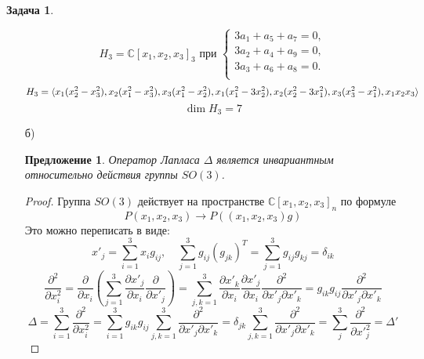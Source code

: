 \documentclass[12pt]{article}
\newtheorem{predl}[theorem]{Предложение}
\theoremstyle{definition}
\newtheorem{zad}{Задача}[section]
\begin{document}
\begin{zad}
\begin{itemize}
\begin{equation}
    \end{equation}
    \begin{equation}
    H_3=\mathbb{C}[x_1,x_2,x_3]_3 \text{ при } \left\{
    \begin{array}{l}
    3a_1+a_5+a_7=0,\\
    3a_2+a_4+a_9=0,\\
    3a_3+a_6+a_8=0.\\
    \end{array}
    \right.
    \end{equation}
    \begin{equation}
         H_3=\braket{x_1(x_2^2-x_3^2),x_2(x_1^2-x_3^2),x_3(x_1^2-x_2^2),x_1(x_1^2-3x_2^2),x_2(x_2^2-3x_1^2),x_3(x_3^2-x_1^2),x_1x_2x_3}
    \end{equation}
    \begin{equation}
        \boxed{\dim H_3=7}
    \end{equation}
    \item[б)] \begin{predl}
    Оператор Лапласа $\Delta$ является инвариантным относительно действия группы $SO(3)$.
    \end{predl}
    \begin{proof}
        Группа $SO(3)$ действует на пространстве $\mathbb{C}[x_1,x_2,x_3]_n$ по формуле
        \begin{equation}
            P(x_1,x_2,x_3)\rightarrow P((x_1,x_2,x_3)g)
        \end{equation}
        Это можно переписать в виде:
        \begin{equation}
            x'_j=\sum\limits_{i=1}^3x_ig_{ij},\quad \sum\limits_{j=1}^3g_{ij}(g_{jk})^T=\sum\limits_{j=1}^3g_{ij}g_{kj}=\delta_{ik}
        \end{equation}
        \begin{equation}
            \frac{\partial^2}{\partial x_i^2}=\frac{\partial}{\partial x_i}\left(\sum\limits_{j=1}^3\frac{\partial x'_j}{\partial x_i}\frac{\partial}{\partial x'_j}\right)=\sum\limits_{j,k=1}^3\frac{\partial x'_k}{\partial x_i}\frac{\partial x'_j}{\partial x_i}\frac{\partial^2}{\partial x'_j\partial x'_k}=g_{ik}g_{ij}\frac{\partial^2}{\partial x'_j\partial x'_k}
        \end{equation}
        \begin{equation}
            \Delta=\sum\limits_{i=1}^3\frac{\partial^2}{\partial x_i^2}=\sum\limits_{i=1}^3g_{ik}g_{ij}\sum\limits_{j,k=1}^3\frac{\partial^2}{\partial x'_j\partial x'_k}=\delta_{jk}\sum\limits_{j,k=1}^3\frac{\partial^2}{\partial x'_j\partial x'_k}=\sum\limits_{j}^3\frac{\partial^2}{\partial x'^2_j}=\Delta'

\end{equation}
\end{proof}
\end{itemize}
\end{zad}
\end{document}
